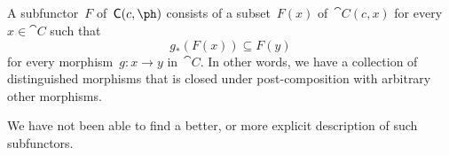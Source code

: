 \subsection{}

A subfunctor~$F$ of~$\cat{C}(c, \ph)$ consists of a subset~$F(x)$ of~$\cat{C}(c, x)$ for every~$x ∈ \cat{C}$ such that
\[
	g_*( F(x) ) ⊆ F(y)
\]
for every morphism~$g \colon x \to y$ in~$\cat{C}$.
In other words, we have a collection of distinguished morphisms that is closed under post-composition with arbitrary other morphisms.

We have not been able to find a better, or more explicit description of such subfunctors.
